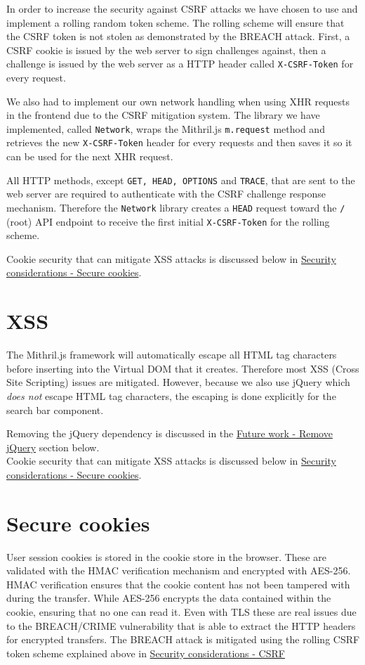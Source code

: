 \documentclass[12pt,a4paper]{report}
\begin{document}
In order to increase the security against CSRF attacks we have chosen to use and implement a rolling random token scheme. The rolling scheme will ensure that the CSRF token is not stolen as demonstrated by the BREACH attack\cite{breach}. First, a CSRF cookie is issued by the web server to sign challenges against, then a challenge is issued by the web server as a HTTP header called \texttt{X-CSRF-Token} for every request.

We also had to implement our own network handling when using XHR requests in the frontend due to the CSRF mitigation system. The library we have implemented, called \texttt{Network}\cite{roaster-network}, wraps the Mithril.js \texttt{m.request} method and retrieves the new \texttt{X-CSRF-Token} header for every requests and then saves it so it can be used for the next XHR request.

All HTTP methods, except \texttt{GET, HEAD, OPTIONS} and \texttt{TRACE}, that are sent to the web server are required to authenticate with the CSRF challenge response mechanism. Therefore the \texttt{Network} library creates a \texttt{HEAD} request toward the \texttt{/} (root) API endpoint to receive the first initial \texttt{X-CSRF-Token} for the rolling scheme.

Cookie security that can mitigate XSS attacks is discussed below in \hyperref[subsec:secure-cookies]{Security considerations - Secure cookies}.

\section{XSS}
The Mithril.js framework will automatically escape all HTML tag characters before inserting into the Virtual DOM that it creates\cite{mithril-trust}. Therefore most XSS (Cross Site Scripting) issues are mitigated. However, because we also use jQuery which \textit{does not} escape HTML tag characters, the escaping is done explicitly for the search bar component.

Removing the jQuery dependency is discussed in the \hyperref[subsec:remove-jquery]{Future work - Remove jQuery} section below.\\
Cookie security that can mitigate XSS attacks is discussed below in \hyperref[subsec:secure-cookies]{Security considerations - Secure cookies}.

\section{Secure cookies}
\label{subsec:secure-cookies}
User session cookies is stored in the cookie store in the browser. These are validated with the HMAC verification mechanism and encrypted with AES-256. HMAC verification ensures that the cookie content has not been tampered with during the transfer\cite{fips-198}. While AES-256 encrypts the data contained within the cookie, ensuring that no one can read it\cite{fips-197}. Even with TLS these are real issues due to the BREACH/CRIME vulnerability that is able to extract the HTTP headers for encrypted transfers\cite{breach}. The BREACH attack is mitigated using the rolling CSRF token scheme explained above in \hyperref[subsec:csrf]{Security considerations - CSRF}
\end{document}
